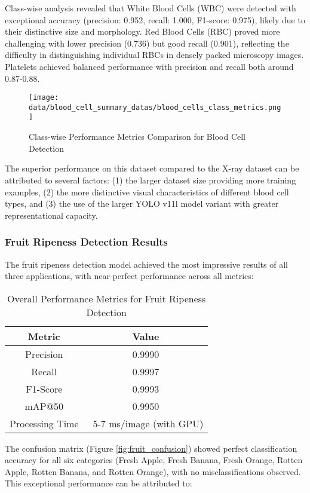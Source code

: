 \begin{multicols}{2}
Class-wise analysis revealed that White Blood Cells (WBC) were detected with exceptional accuracy (precision: 0.952, recall: 1.000, F1-score: 0.975), likely due to their distinctive size and morphology. Red Blood Cells (RBC) proved more challenging with lower precision (0.736) but good recall (0.901), reflecting the difficulty in distinguishing individual RBCs in densely packed microscopy images. Platelets achieved balanced performance with precision and recall both around 0.87-0.88.

\begin{figure}[h]
\centering
\texttt{[image: data/blood\_cell\_summary\_datas/blood\_cells\_class\_metrics.png]}
\caption{Class-wise Performance Metrics Comparison for Blood Cell Detection}
\label{fig:blood_cell_class_metrics}
\end{figure}

The superior performance on this dataset compared to the X-ray dataset can be attributed to several factors: (1) the larger dataset size providing more training examples, (2) the more distinctive visual characteristics of different blood cell types, and (3) the use of the larger YOLO v11l model variant with greater representational capacity.

\subsubsection{Fruit Ripeness Detection Results}

The fruit ripeness detection model achieved the most impressive results of all three applications, with near-perfect performance across all metrics:

\begin{table}[h]
\centering
\begin{tabular}{|c|c|}
\hline
\textbf{Metric} & \textbf{Value} \\
\hline
Precision & 0.9990 \\
Recall & 0.9997 \\
F1-Score & 0.9993 \\
mAP@50 & 0.9950 \\
Processing Time & ~5-7 ms/image (with GPU) \\
\hline
\end{tabular}
\caption{Overall Performance Metrics for Fruit Ripeness Detection}
\label{tab:fruit_results}
\end{table}

The confusion matrix (Figure \ref{fig:fruit_confusion}) showed perfect classification accuracy for all six categories (Fresh Apple, Fresh Banana, Fresh Orange, Rotten Apple, Rotten Banana, and Rotten Orange), with no misclassifications observed. This exceptional performance can be attributed to:


\end{multicols}
